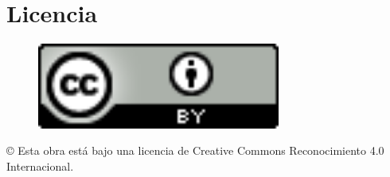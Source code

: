 \documentclass[a4paper,openright,14pt]{book}
\begin{document}
\chapter*{Licencia}

\vspace*{0.4in}
\begin{center}
	\begin{figure}[htb]
		\begin{center}
			\includegraphics[width=8cm]{./images/logotipo-licencia.png}
		\end{center}
	\end{figure}

	\begin{Large}
		© Esta obra está bajo una licencia de Creative Commons Reconocimiento 4.0 Internacional.
	\end{Large}
\end{center}
\end{document}
